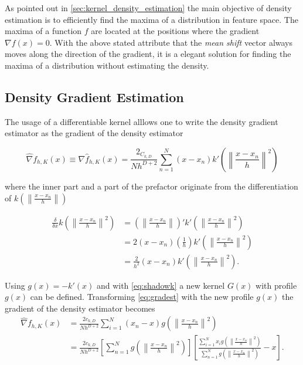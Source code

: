 As pointed out in \autoref{sec:kernel_density_estimation} the main objective of
density estimation is to efficiently find the maxima of a distribution in
feature space. The maxima of a function $f$ are located at the positions where
the gradient $\nabla f(x) = 0$. With the above stated attribute that the \emph{mean shift} vector
always moves along the direction of the gradient, it is a elegant solution for 
finding the maxima of a distribution without estimating the density.

\subsection{Density Gradient Estimation} %
\label{sub:gradient_estimation}
The usage of a differentiable kernel alllows one to write the density gradient 
estimator as the gradient of the density estimator

\begin{equation}\label{eq:gradest}
	\hat{\nabla} f_{h,K}(x) \equiv \nabla \hat{f}_{h,K}(x) = 
	\frac{2_{C_{k,D}}}{Nh^{D+2}}%
	\sum_{n = 1}^N (x - x_n)k' 
	\left( \left\lVert \frac{x - x_n}{h} \right\rVert^2 \right)
\end{equation}

where the inner part and a part of the prefactor originate from the differentiation
of $k\left( \left\lVert \frac{x - x_n}{h} \right\rVert \right)$

\begin{equation}\label{eq:kerndiff}
	\begin{split}
		\frac{\delta}{\delta x}
		k\left( \left\lVert \frac{x - x_n}{h} \right\rVert^2 \right) & = 
		\left( \left\lVert \frac{x - x_n}{h} \right\rVert \right)'
		k'\left( \left\lVert \frac{x - x_n}{h} \right\rVert^2 \right) \\ & =
		2 \left( x - x_n \right) \left( \frac{1}{h} \right) 
		k'\left( \left\lVert \frac{x - x_n}{h} \right\rVert^2 \right) \\ & =
		\frac{2}{h^2}(x - x_n)
		k'\left( \left\lVert \frac{x - x_n}{h} \right\rVert^2 \right).
	\end{split}
\end{equation}

Using $g(x) = -k'(x)$ and with \autoref{eq:shadowk} a new kernel $G(x)$ with
profile $g(x)$ can be defined. Transforming \autoref{eq:gradest} with the new
profile $g(x)$ the gradient of the density estimator becomes
\begin{subequations}
	\begin{align}
	\hat{\nabla} f_{h,K}(x) & = \frac{2c_{k,D}}{Nh^{D+2}}\sum_{i=1}^N \left(x_n -
    x\right)g\left(\left\lVert \frac{x - x_n}{h} \right\rVert^2\right) \label{eq:gradest1}\\ & 
	= \frac{2c_{k,D}}{Nh^{D+2}} \left[ \sum_{n=1}^N g\left(\left\lVert
	\frac{x - x_n}{h} \right\rVert^2\right) \right] \left[
	\frac{\sum_{i=1}^N x_i g\left(\left\lVert \frac{x - x_n}{h}
	\right\rVert^2\right)}{\sum_{n=1}^N g\left(\left\lVert \frac{x - x_n}{h}
	\right\rVert^2\right)} - x \right].
	\label{eq:gradest2}
	\end{align}
\end{subequations}


